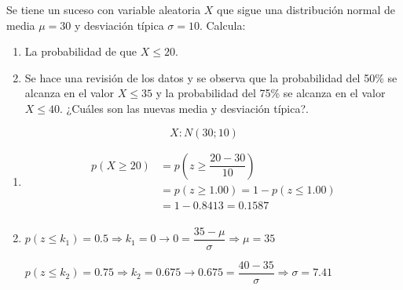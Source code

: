 \begin{exercise}
  Se tiene un suceso con variable aleatoria $X$ que sigue una distribución normal de media $\mu = 30$ y desviación típica $\sigma=10$. Calcula:
  \begin{enumerate}[label=\alph* )]
  \item La probabilidad de que $X \leq 20$.
  \item Se hace una revisión de los datos y se observa que la probabilidad del 50\% se alcanza en el valor $X \leq 35$ y la probabilidad del 75\% se alcanza en el valor $X \leq 40$. ¿Cuáles son las nuevas media y desviación típica?.
  \end{enumerate}

  \tcblower

  \[ X:N(30;10) \]

  \begin{enumerate}[label=\alph* )]
  \item
  \begin{align*}
  p(X \geq 20) & = p \left( z \geq  \dfrac{20-30}{10} \right)  \\
  & = p(z \geq 1.00) =1-p(z \leq 1.00) \\
  & = 1-0.8413 = 0.1587 \\
  \end{align*}
  \item

  $p(z \leq k_1 )=0.5 \Rightarrow k_1 = 0 \rightarrow 0 = \dfrac{35-\mu}{\sigma} \Rightarrow \mu = 35$


  $p(z \leq k_2 )=0.75 \Rightarrow k_2 = 0.675 \rightarrow 0.675 = \dfrac{40-35}{\sigma} \Rightarrow \sigma = 7.41$

  \end{enumerate}
\end{exercise}

